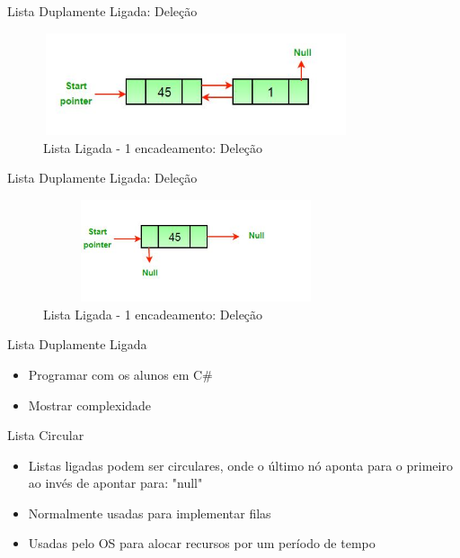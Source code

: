 \begin{frame}
	\begin{block}{Lista Duplamente Ligada: Deleção}
		\begin{figure}[!htb]
			\centering	  				
			\includegraphics[height=3cm, width = 9cm]{./pic/Delete_lincked_list3.jpg}
			\caption{Lista Ligada - 1 encadeamento: Deleção}
			\label{fig_LDE_end}
		\end{figure}
	\end{block}
\end{frame}

\begin{frame}
	\begin{block}{Lista Duplamente Ligada: Deleção}
		\begin{figure}[!htb]
			\centering	  				
			\includegraphics[height=3cm, width = 9cm]{./pic/Delete_lincked_list4.jpg}
			\caption{Lista Ligada - 1 encadeamento: Deleção}
			\label{fig_LDE_end}
		\end{figure}
	\end{block}
\end{frame}

\begin{frame}
	\begin{block}{Lista Duplamente Ligada}
	\begin{itemize}
			\item Programar com os alunos em C\#
			\item Mostrar complexidade
		\end{itemize}
	\end{block}
\end{frame}


\begin{frame}
	\begin{block}{Lista Circular}
	\begin{itemize}
			\item Listas ligadas podem ser circulares, onde o último nó aponta para o primeiro ao invés de apontar para: "null"

			\item Normalmente usadas para implementar filas
			
			\item Usadas pelo OS para alocar recursos por um período de tempo

		\end{itemize}
	\end{block}
\end{frame}

